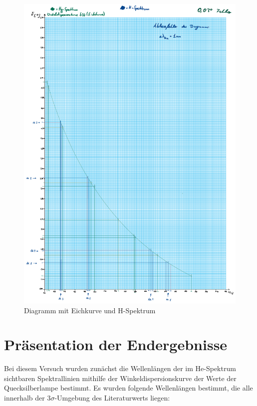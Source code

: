\documentclass{article}
\begin{document}
\begin{figure} [p]
    \centering
    \includegraphics[width=\textwidth]{graphics/dia2.pdf}
    \caption{Diagramm mit Eichkurve und H-Spektrum}
\end{figure}

\newpage

\section{Präsentation der Endergebnisse}

Bei diesem Versuch wurden zunächst die Wellenlängen der im He-Spektrum sichtbaren Spektrallinien mithilfe der Winkeldispersionskurve der Werte der Quecksilberlampe bestimmt. Es wurden folgende Wellenlängen bestimmt, die alle innerhalb der $3\sigma$-Umgebung des Literaturwerts liegen:
\end{document}

